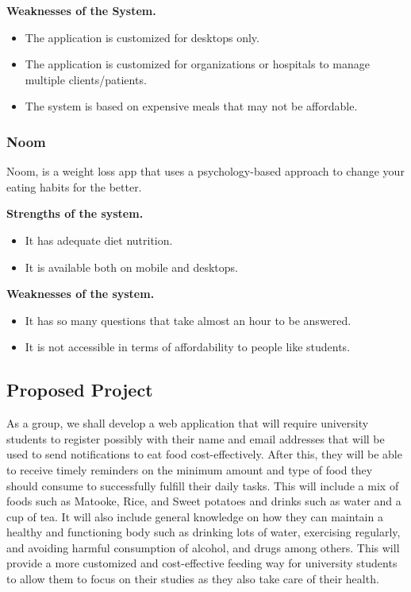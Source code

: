 \documentclass{article}
\begin{document}
\textbf{Weaknesses of the System.}
\begin{itemize}
\item The application is customized for desktops only.
\item The application is customized for organizations or hospitals to manage multiple clients/patients.
\item The system is based on expensive meals that may not be affordable.
\end{itemize}

\subsubsection{Noom}
Noom,\cite{noon} is a weight loss app that uses a psychology-based approach to change your eating habits for
the better.

\textbf{Strengths of the system.}
\begin{itemize}
\item It has adequate diet nutrition.
\item It is available both on mobile and desktops.
\end{itemize}

\textbf{Weaknesses of the system.}
\begin{itemize}
\item It has so many questions that take almost an hour to be answered.
\item It is not accessible in terms of affordability to people like students.
\end{itemize}

\subsection{Proposed Project}
As a group, we shall develop a web application that will require university students to register possibly with their name and email addresses that will be used to send notifications to eat food cost-effectively. After this, they will be able to receive timely reminders on the minimum amount and type of food they should consume to successfully fulfill their daily tasks. This will include a mix of foods such as Matooke, Rice, and Sweet potatoes and drinks such as water and a cup of tea. It will also include general knowledge on how they can maintain a healthy and functioning body such as drinking lots of water, exercising regularly, and avoiding harmful consumption of alcohol, and drugs among others.
This will provide a more customized and cost-effective feeding way for university students to allow them to focus on their studies as they also take care of their health.
\end{document}
